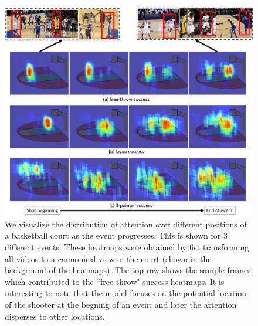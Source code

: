 \begin{figure}[t!]
\begin{center}
  \includegraphics[width=7in]{images/heatmap_figure_v2_cropped.pdf}
\end{center}
   \caption{We visualize the distribution of attention over different positions of
   a basketball court as the event progresses. This is shown for 3 different events.
   These heatmaps were obtained by fist transforming all videos
 to a cannonical view of the court (shown in the background of the heatmaps). The top row shows
 the sample frames which contributed to the ``free-throw" success heatmaps. It is interesting
 to note that the model focuses on the potential location of the shooter at the begning of an
 event and later the attention disperses to other locations.}
\label{fig:att_heatmap}
\end{figure}

